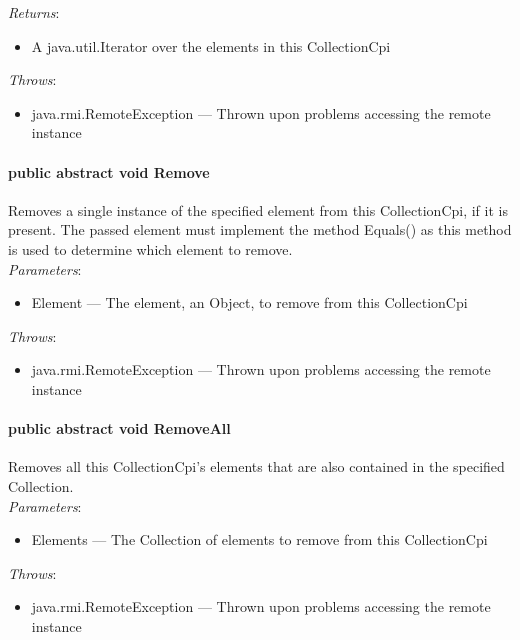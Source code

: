 \documentclass[$Date: 2003/06/26 19:29:31 $]{glabarticle}
\begin{document}
\textit{Returns}:
\begin{itemize}
\item[] A java.util.Iterator over the elements in this CollectionCpi
\end{itemize}

 \textit{Throws}:
 \begin{itemize}
 \item[] java.rmi.RemoteException --- Thrown upon problems accessing the remote instance 
 \end{itemize}

\paragraph{public abstract void Remove}

Removes a single instance of the specified element from this
CollectionCpi, if it is present. The passed element must implement the
method Equals() as this method is used to determine which element to
remove.\\

\textit{Parameters}:
\begin{itemize}
\item[] Element --- The element, an Object, to remove from this CollectionCpi
\end{itemize}

 \textit{Throws}:
 \begin{itemize}
 \item[] java.rmi.RemoteException --- Thrown upon problems accessing the remote instance 
 \end{itemize}

\paragraph{public abstract void RemoveAll}

Removes all this CollectionCpi's elements that are also contained in the
specified Collection.\\

\textit{Parameters}:
\begin{itemize}
\item[] Elements --- The Collection of elements to remove from this CollectionCpi 
\end{itemize}

 \textit{Throws}:
 \begin{itemize}
 \item[] java.rmi.RemoteException --- Thrown upon problems accessing the remote instance 
 \end{itemize}
\end{document}
